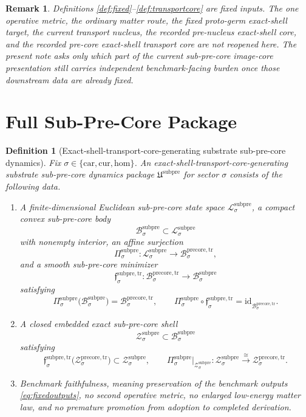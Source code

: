 \documentclass[11pt]{article}
\newcommand{\Car}{\mathrm{car}}
\newcommand{\Cur}{\mathrm{cur}}
\newcommand{\Hom}{\mathrm{hom}}
\newcommand{\PreCoreTrBody}[1]{\mathcal B_{#1}^{\mathrm{precore,tr}}}
\newcommand{\PreCoreTrShell}[1]{\mathcal Z_{#1}^{\mathrm{precore,tr}}}
\newcommand{\SubPreCorePackage}{\mathfrak U^{\mathrm{subpre}}}
\newcommand{\SubPreCoreSpace}[1]{\mathcal L_{#1}^{\mathrm{subpre}}}
\newcommand{\SubPreCoreBody}[1]{\mathcal B_{#1}^{\mathrm{subpre}}}
\newcommand{\SubPreCoreProj}[1]{\Pi_{#1}^{\mathrm{subpre}}}
\newcommand{\SubPreCoreTransportMin}[1]{\mathfrak f_{#1}^{\mathrm{subpre,tr}}}
\newcommand{\SubPreCoreShellSet}[1]{\mathcal Z_{#1}^{\mathrm{subpre}}}
\newtheorem{definition}{Definition}
\newtheorem{remark}{Remark}
\begin{document}
\begin{remark}
Definitions \ref{def:fixed}--\ref{def:transportcore} are fixed inputs. The one operative metric, the ordinary matter route, the fixed proto-germ exact-shell target, the current transport nucleus, the recorded pre-nucleus exact-shell core, and the recorded pre-core exact-shell transport core are not reopened here. The present note asks only which part of the current sub-pre-core image-core presentation still carries independent benchmark-facing burden once those downstream data are already fixed.
\end{remark}

\section{Full Sub-Pre-Core Package}

\begin{definition}[Exact-shell-transport-core-generating substrate sub-pre-core dynamics]
\label{def:subpre}
Fix \(\sigma\in\{\Car,\Cur,\Hom\}\). An exact-shell-transport-core-generating substrate sub-pre-core dynamics package \(\SubPreCorePackage\) for sector \(\sigma\) consists of the following data.
\begin{enumerate}
    \item A finite-dimensional Euclidean sub-pre-core state space \(\SubPreCoreSpace{\sigma}\), a compact convex sub-pre-core body
    \[
    \SubPreCoreBody{\sigma}\subset\SubPreCoreSpace{\sigma}
    \]
    with nonempty interior, an affine surjection
    \[
    \SubPreCoreProj{\sigma}:\SubPreCoreSpace{\sigma}\to\PreCoreTrBody{\sigma},
    \]
    and a smooth sub-pre-core minimizer
    \[
    \SubPreCoreTransportMin{\sigma}:\PreCoreTrBody{\sigma}\to\SubPreCoreBody{\sigma}
    \]
    satisfying
    \[
    \SubPreCoreProj{\sigma}\bigl(\SubPreCoreBody{\sigma}\bigr)=\PreCoreTrBody{\sigma},
    \qquad
    \SubPreCoreProj{\sigma}\circ\SubPreCoreTransportMin{\sigma}
    =
    \mathrm{id}_{\PreCoreTrBody{\sigma}}.
    \]
    \item A closed embedded exact sub-pre-core shell
    \[
    \SubPreCoreShellSet{\sigma}\subset\SubPreCoreBody{\sigma}
    \]
    satisfying
    \[
    \SubPreCoreTransportMin{\sigma}\bigl(\PreCoreTrShell{\sigma}\bigr)
    \subset
    \SubPreCoreShellSet{\sigma},
    \qquad
    \SubPreCoreProj{\sigma}\big|_{\SubPreCoreShellSet{\sigma}}
    :
    \SubPreCoreShellSet{\sigma}
    \xrightarrow{\cong}
    \PreCoreTrShell{\sigma}.
    \]
    \item Benchmark faithfulness, meaning preservation of the benchmark outputs \eqref{eq:fixedoutputs}, no second operative metric, no enlarged low-energy matter law, and no premature promotion from adoption to completed derivation.
\end{enumerate}
\end{definition}
\end{document}
